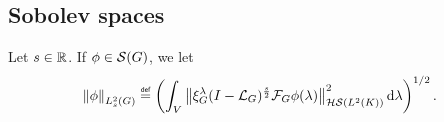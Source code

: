 %
%
%

\subsection{Sobolev spaces}

\begin{definition}
    Let $s \in \mathbb{R}$.
    If $\phi \in {\mathcal{S} (G)}$, we let
    \begin{align*}
        \norm[\Sobolev{s}]{\phi} \defeq
        \left(
            \int_\VectorSpace
                \norm[\HilbertSchmidt{\Lebesgue{2}{\CompactGroup}}]{%
                    \Rep\lambda \BesselPotential{s}
                    \Fourier \phi(\lambda)
                    }^2
            \dd \lambda
        \right)^{1 / 2}.
    \end{align*}
\end{definition}

